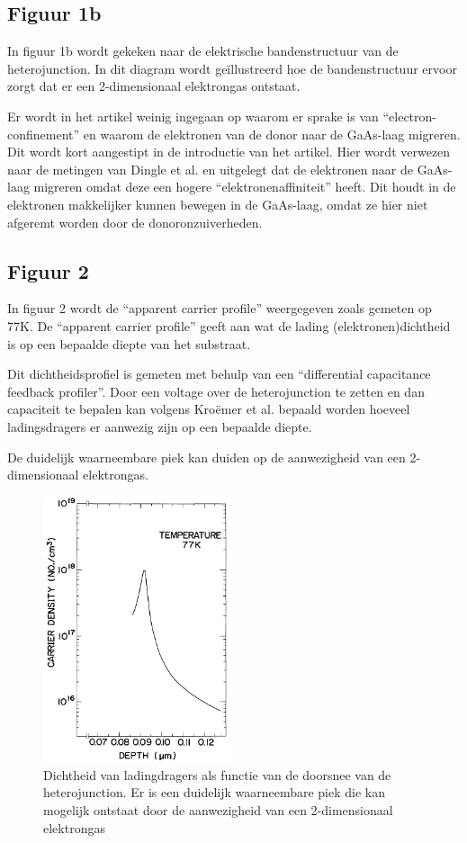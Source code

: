 \documentclass[11pt]{article}
\begin{document}
\subsection{Figuur 1b}
In figuur 1b wordt gekeken naar de elektrische bandenstructuur van de heterojunction. In dit diagram wordt ge\"illustreerd hoe de bandenstructuur ervoor zorgt dat er een 2-dimensionaal elektrongas ontstaat. 

Er wordt in het artikel weinig ingegaan op waarom er sprake is van ``electron-confinement'' en waarom de elektronen van de donor naar de GaAs-laag migreren. Dit wordt kort aangestipt in de introductie van het artikel. Hier wordt verwezen naar de metingen van Dingle et al. en uitgelegt dat de elektronen naar de GaAs-laag migreren omdat deze een hogere ``elektronenaffiniteit'' heeft. Dit houdt in de elektronen makkelijker kunnen bewegen in de GaAs-laag, omdat ze hier niet afgeremt worden door de donoronzuiverheden.

\subsection{Figuur 2}
In figuur 2 wordt de ``apparent carrier profile'' weergegeven zoals gemeten op 77K. De ``apparent carrier profile'' geeft aan wat de lading (elektronen)dichtheid is op een bepaalde diepte van het substraat.

Dit dichtheidsprofiel is gemeten met behulp van een ``differential capacitance feedback profiler''. Door een voltage over de heterojunction te zetten en dan capaciteit te bepalen kan volgens Kro\"emer et al. bepaald worden hoeveel ladingsdragers er aanwezig zijn op een bepaalde diepte.

De duidelijk waarneembare piek kan duiden op de aanwezigheid van een 2-dimensionaal elektrongas.

\begin{figure}[h]
  \begin{center}
\includegraphics[width=0.5\textwidth]{carrier_profile_depth.png}
\caption{Dichtheid van ladingdragers als functie van de doorsnee van de heterojunction. Er is een duidelijk waarneembare piek die kan mogelijk ontstaat door de aanwezigheid van een 2-dimensionaal elektrongas}
\label{fig:carrierprofile}
  \end{center}
\end{figure}
\end{document}
